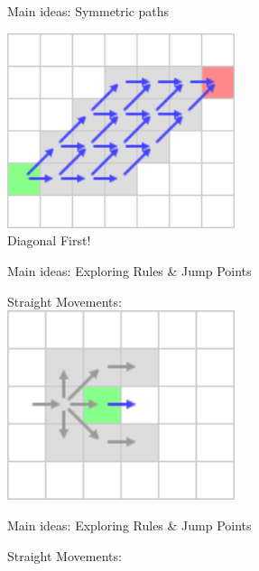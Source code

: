 \documentclass{presentation}
\begin{document}
\begin{frame}{Main ideas: Symmetric paths}
	\begin{center}
		\includegraphics[width=0.5\textwidth]{figures/symmetricpath.png}\\
		\vspace{1cm}
		Diagonal First!
	\end{center}
\end{frame}


\begin{frame}{Main ideas: Exploring Rules \& Jump Points}
	\begin{center}
		Straight Movements:\\
		\vspace{5mm}
		\includegraphics[width=0.5\textwidth]{figures/extra_geschnitten/sm.png}
	\end{center}
\end{frame}


\begin{frame}{Main ideas: Exploring Rules \& Jump Points}
		\begin{center}
		Straight Movements:\\
		\vspace{5mm}
		\begin{minipage}{0.3\textwidth}
		\end{minipage}%
		\pause%
		\hfill%
		\begin{minipage}{0.3\textwidth}
		\end{minipage}%
		\pause%
		\hfill%
		\begin{minipage}{0.3\textwidth}
		\end{minipage}%
	\end{center}
\end{frame}
\end{document}
